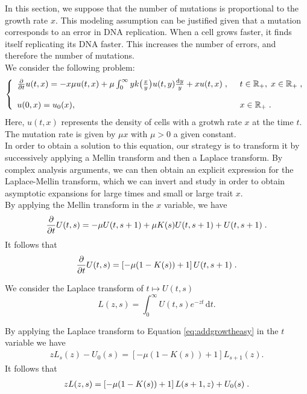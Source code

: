 \documentclass[11pt]{amsart}
\newcommand{\diff}{\,\mathrm{d}}
\begin{document}
In this section, we suppose that the number of mutations is proportional to the growth rate $x$. This modeling assumption can be justified given that a mutation corresponds to an error in DNA replication. When a cell grows faster, it finds itself replicating its DNA faster. This increases the number of errors, and therefore the number of mutations.\\

We consider the following problem:
\begin{equation}\left\{
    \begin{array}{ll}
	\frac{\partial}{\partial t}u(t,x) = - x\mu u(t,x) + \mu \int_{0}^{\infty} y k\big( \frac{x}{y}\big) u(t,y) \frac{\mathrm dy}{y} + xu(t,x)
	\; , \enspace
	& t \in \mathbb{R}_+, \; x \in \mathbb{R}_+ \; ,
	\\ \\
	u(0, x) = u_0(x),
	& x \in \mathbb{R}_+
	\; .
    \end{array}
	\right.
\end{equation}
Here, $u(t,x)$ represents the density of cells with a grotwh rate $x$ at the time $t$. The mutation rate is given by $\mu x$ with $\mu>0$ a given constant. \\

In order to obtain a solution to this equation, our strategy is to transform it by successively applying a Mellin transform and then a Laplace transform. By complex analysis arguments, we can then obtain an explicit expression for the Laplace-Mellin transform, which we can invert and study in order to obtain asymptotic expansions for large times and small or large trait $x$. \\

By applying the Mellin transform in the $x$ variable, we have
	\begin{equation*}
		\frac{\partial}{\partial t} U(t,s) = - \mu U(t,s+1) + \mu K(s) U(t,s+1) + U(t,s+1)
		\; .
	\end{equation*}
It follows that
    \begin{equation}
        \frac{\partial}{\partial t} U(t,s) = \left[- \mu (1-K(s)) + 1\right] U(t,s+1)
		\; .
        \label{eq:addgrowtheasy}
    \end{equation}

We consider the Laplace transform of $t \mapsto U(t,s)$
$$ L(z,s) = \int_0^\infty U(t,s)e^{-zt}\diff t.$$ 

By applying the Laplace transform to Equation \eqref{eq:addgrowtheasy} in the $t$ variable we have 
\begin{align*}
    zL_s(z) - U_0(s) = \left[- \mu (1-K(s)) + 1\right] L_{s+1}(z).
\end{align*}
It follows that 
\begin{align}
    \label{eq:wienerhopfeq}
    zL(z,s) = \left[- \mu (1-K(s)) + 1\right] L(s+1,z) + U_0(s)
    \; .
\end{align} 
\end{document}
